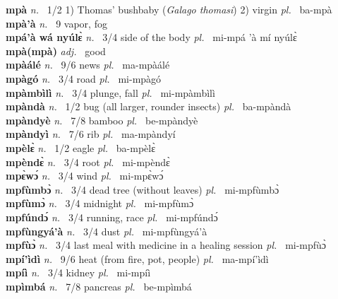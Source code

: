 {\bfseries mpà}  {\itshape n.~} 1/2 1) Thomas' bushbaby ({\itshape Galago thomasi}) 2) virgin {\itshape pl.~} ba-mpà    \\ 
{\bfseries mpà'à}  {\itshape n.~} 9 vapor, fog    \\ 
{\bfseries mpá'à wá nyúlɛ̀}  {\itshape n.~} 3/4 side of the body {\itshape pl.~} mi-mpá 'à mí nyúlɛ̀ \\ 
{\bfseries mpà(mpà)}  {\itshape adj.~} good    \\ 
{\bfseries mpàálé}  {\itshape n.~} 9/6 news {\itshape pl.~} ma-mpàálé    \\ 
{\bfseries mpàgó}  {\itshape n.~} 3/4 road {\itshape pl.~} mi-mpàgó    \\ 
{\bfseries mpàmbìlì}  {\itshape n.~} 3/4 plunge, fall {\itshape pl.~} mi-mpàmbìlì    \\ 
{\bfseries mpàndà}  {\itshape n.~} 1/2 bug (all larger, rounder insects) {\itshape pl.~} ba-mpàndà    \\ 
{\bfseries mpàndyè}  {\itshape n.~} 7/8 bamboo {\itshape pl.~} be-mpàndyè    \\ 
{\bfseries mpàndyì}  {\itshape n.~} 7/6 rib {\itshape pl.~} ma-mpàndyí    \\ 
{\bfseries mpèlɛ̀}  {\itshape n.~} 1/2 eagle {\itshape pl.~} ba-mpèlɛ̀    \\ 
{\bfseries mpèndɛ̀}  {\itshape n.~} 3/4 root {\itshape pl.~} mi-mpèndɛ̀    \\ 
{\bfseries mpɛ̀wɔ́}  {\itshape n.~} 3/4 wind {\itshape pl.~} mi-mpɛ̀wɔ́    \\ 
{\bfseries mpfùmbɔ̀}  {\itshape n.~} 3/4 dead tree (without leaves) {\itshape pl.~} mi-mpfùmbɔ̀    \\ 
{\bfseries mpfùmɔ̀}  {\itshape n.~} 3/4 midnight {\itshape pl.~} mi-mpfùmɔ̀    \\ 
{\bfseries mpfúndɔ́}  {\itshape n.~} 3/4 running, race {\itshape pl.~} mi-mpfúndɔ́    \\ 
{\bfseries mpfùngyá'à}  {\itshape n.~} 3/4 dust {\itshape pl.~} mi-mpfùngyá'à    \\ 
{\bfseries mpfùɔ̀}  {\itshape n.~} 3/4 last meal with medicine in a healing session {\itshape pl.~} mi-mpfùɔ̀    \\ 
{\bfseries mpí'ìdì}  {\itshape n.~} 9/6 heat (from fire, pot, people) {\itshape pl.~} ma-mpí'ìdì    \\ 
{\bfseries mpíì}  {\itshape n.~} 3/4 kidney {\itshape pl.~} mi-mpíì    \\ 
{\bfseries mpìmbá}  {\itshape n.~} 7/8 pancreas {\itshape pl.~} be-mpìmbá    \\ 
